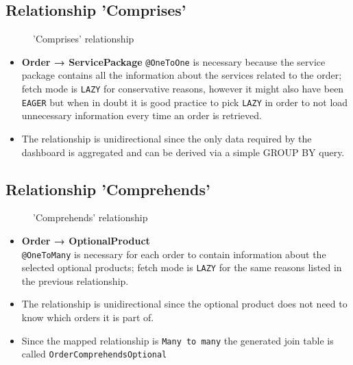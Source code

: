 \subsection*{Relationship 'Comprises'}

\begin{minipage}[h]{0.5\textwidth}
    \begin{figure}[H]
        
        \caption{'Comprises' relationship}
        \label{fig:orm_o_sp}
    \end{figure}
\end{minipage}
\hfill
\begin{minipage}[h]{0.48\textwidth}
    \begin{itemize}
        \item \textbf{Order → ServicePackage} \texttt{@OneToOne} is necessary because the service package contains all the information about the services related to the order; fetch mode is \texttt{LAZY} for conservative reasons, however it might also have been \texttt{EAGER} but when in doubt it is good practice to pick \texttt{LAZY} in order to not load unnecessary information every time an order is retrieved.
        \item The relationship is unidirectional since the only data required by the dashboard is aggregated and can be derived via a simple GROUP BY query.
    \end{itemize}
\end{minipage}

\subsection*{Relationship 'Comprehends'}

\begin{minipage}[h]{0.5\textwidth}
    \begin{figure}[H]
        
        \caption{'Comprehends' relationship}
        \label{fig:orm_o_sp}
    \end{figure}
\end{minipage}
\hfill
\begin{minipage}[h]{0.48\textwidth}
    \begin{itemize}
        \item \textbf{Order → OptionalProduct} \\ \texttt{@OneToMany} is necessary for each order to contain information about the selected optional products; fetch mode is \texttt{LAZY} for the same reasons listed in the previous relationship.
        \item The relationship is unidirectional since the optional product does not need to know which orders it is part of.
        \item Since the mapped relationship is \texttt{Many to many} the generated join table is called \texttt{OrderComprehendsOptional}
    \end{itemize}
\end{minipage}

